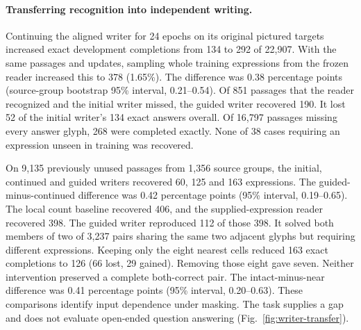 \paragraph{Transferring recognition into independent writing.}
Continuing the aligned writer for 24 epochs on its original pictured
targets increased exact development completions from 134 to 292 of
22,907. With the same passages and updates, sampling whole training
expressions from the frozen reader increased this to 378 (1.65\%).
The difference was 0.38 percentage points (source-group bootstrap
95\% interval, 0.21--0.54). Of 851 passages that the reader recognized
and the initial writer missed, the guided writer recovered 190. It
lost 52 of the initial writer's 134 exact answers overall. Of 16,797
passages missing every answer glyph, 268 were completed exactly. None of
38 cases requiring an expression unseen in training was recovered.

On 9,135 previously unused passages from 1,356 source groups, the initial,
continued and guided writers recovered 60, 125 and 163 expressions.
The guided-minus-continued difference was 0.42 percentage points (95\%
interval, 0.19--0.65). The local count baseline recovered 406, and the
supplied-expression reader recovered 398. The guided writer reproduced
112 of those 398. It solved both members of two of 3,237 pairs sharing
the same two adjacent glyphs but requiring different expressions.
Keeping only the eight nearest cells reduced 163 exact completions to
126 (66 lost, 29 gained). Removing those eight gave seven. Neither
intervention preserved a complete both-correct pair. The intact-minus-near
difference was 0.41 percentage points (95\% interval, 0.20--0.63).
These comparisons identify input dependence under masking. The task
supplies a gap and does not evaluate open-ended question answering
(Fig.~\ref{fig:writer-transfer}).
